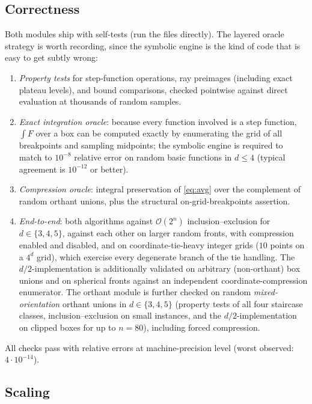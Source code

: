 \documentclass[11pt,a4paper]{article}
\theoremstyle{remark}
\newcommand{\Oh}{\mathcal{O}}
\begin{document}
\subsection{Correctness}

Both modules ship with self-tests (run the files directly).  The layered
oracle strategy is worth recording, since the symbolic engine is the kind of
code that is easy to get subtly wrong:
\begin{enumerate}\itemsep2pt
\item \emph{Property tests} for step-function operations, ray preimages
  (including exact plateau levels), and bound comparisons, checked pointwise
  against direct evaluation at thousands of random samples.
\item \emph{Exact integration oracle}: because every function involved is a
  step function, $\int F$ over a box can be computed exactly by enumerating
  the grid of all breakpoints and sampling midpoints; the symbolic engine is
  required to match to $10^{-8}$ relative error on random basic functions in
  $d\le4$ (typical agreement is $10^{-12}$ or better).
\item \emph{Compression oracle}: integral preservation of \eqref{eq:avg}
  over the complement of random orthant unions, plus the structural
  on-grid-breakpoints assertion.
\item \emph{End-to-end}: both algorithms against $\Oh(2^n)$
  inclusion--exclusion for $d\in\{3,4,5\}$, against each other on larger
  random fronts, with compression enabled and disabled, and on
  coordinate-tie-heavy integer grids ($10$ points on a $4^d$ grid), which
  exercise every degenerate branch of the tie handling.  The
  $d/2$-implementation is additionally validated on arbitrary
  (non-orthant) box unions and on spherical fronts against an independent
  coordinate-compression enumerator.  The orthant module is further checked
  on random \emph{mixed-orientation} orthant unions in $d\in\{3,4,5\}$
  (property tests of all four staircase classes, inclusion--exclusion on
  small instances, and the $d/2$-implementation on clipped boxes for up to
  $n=80$), including forced compression.
\end{enumerate}
All checks pass with relative errors at machine-precision level (worst
observed: $4\cdot10^{-14}$).

\subsection{Scaling}
\end{document}
